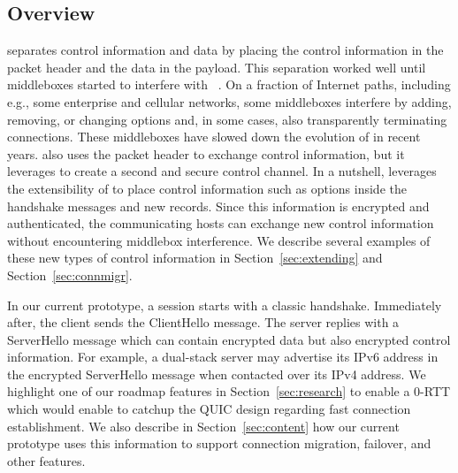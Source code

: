 \subsection{Overview}

\tcp separates control information and data by placing the control information in
the packet header and the data in the payload. This separation worked well until
middleboxes started to interfere with \tcp~\cite{10.1145/1064413.1064418,
honda2011still, DHBVD13}.  On a fraction of Internet paths, including e.g.,
some enterprise and cellular networks, some middleboxes interfere by adding,
removing, or changing \tcp options \cite{wang2011untold, honda2011still, xu2015investigating} and, in some cases, also
transparently terminating \tcp connections. These middleboxes have slowed down
the evolution of \tcp in recent years. \tcpls also uses the packet header to
exchange \tcp control information, but it leverages \tls to create a second and
secure control channel. In a nutshell, \tcpls leverages the extensibility of  to place control information such as \tcp options inside the \tls handshake
messages and new \tls records. Since this information is encrypted and
authenticated, the communicating hosts can exchange new control information
without encountering middlebox interference. We describe several examples of these new
types of control information in Section~\ref{sec:extending} and
Section~\ref{sec:connmigr}.




In our current prototype, a \tcpls session starts with a classic \tcp
handshake. Immediately after, the client sends the ClientHello \tls message. The
server replies with a ServerHello message which can contain encrypted data but
also encrypted control information. For example, a dual-stack server may
advertise its IPv6 address in the encrypted ServerHello message when contacted
over its IPv4 address.
We highlight one of our roadmap features in
Section~\ref{sec:research} to enable a 0-RTT \tcpls which would enable \tcp to catchup
the QUIC design regarding fast connection establishment. We also describe in
Section~\ref{sec:content} how our current prototype uses this
information to support connection migration, failover, and other features.


